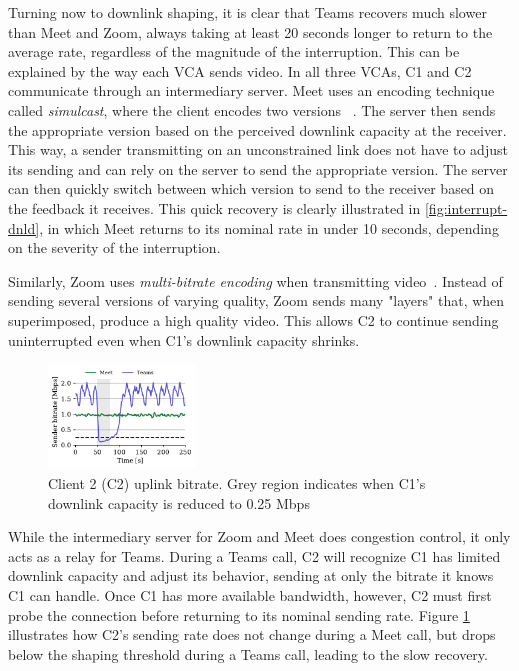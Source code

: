 Turning now to downlink shaping, it is clear that Teams recovers much slower than Meet and Zoom, always taking at least 20 seconds longer to return to the average rate, regardless of the magnitude of the interruption. This can be explained by the way each VCA sends video. In all three VCAs, C1 and C2 communicate through an intermediary server. Meet uses an encoding technique called \textit{simulcast}, where the client encodes two versions ~\cite{nistico2020comparative}. The server then sends the appropriate version based on the perceived downlink capacity at the receiver. This way, a sender transmitting on an unconstrained link does not have to adjust its sending and can rely on the server to send the appropriate version. The server can then quickly switch between which version to send to the receiver based on the feedback it receives. This quick recovery is clearly illustrated in \ref{fig:interrupt-dnld}, in which Meet returns to its nominal rate in under 10 seconds, depending on the severity of the interruption.

Similarly, Zoom uses \textit{multi-bitrate encoding} when transmitting video~\cite{zoom_encoding}. Instead of sending several versions of varying quality, Zoom sends many "layers" that, when superimposed, produce a high quality video. This allows C2 to continue sending uninterrupted even when C1's downlink capacity shrinks. 

\begin{figure}[t]
    \centering
    \includegraphics[width=0.35\textwidth,keepaspectratio]{../figures/interrupt/Interrupt-sender.pdf}
    \caption{Client 2 (C2) uplink bitrate. Grey region indicates when C1's downlink capacity is reduced to 0.25 Mbps}
    \label{fig:interrupt-sender}
\end{figure}

While the intermediary server for Zoom and Meet does congestion control, it only acts as a relay for Teams. During a Teams call, C2 will recognize C1 has limited downlink capacity and adjust its behavior, sending at only the bitrate it knows C1 can handle. Once C1 has more available bandwidth, however, C2 must first probe the connection before returning to its nominal sending rate. Figure \ref{fig:interrupt-sender} illustrates how C2's sending rate does not change during a Meet call, but drops below the shaping threshold during a Teams call, leading to the slow recovery.

